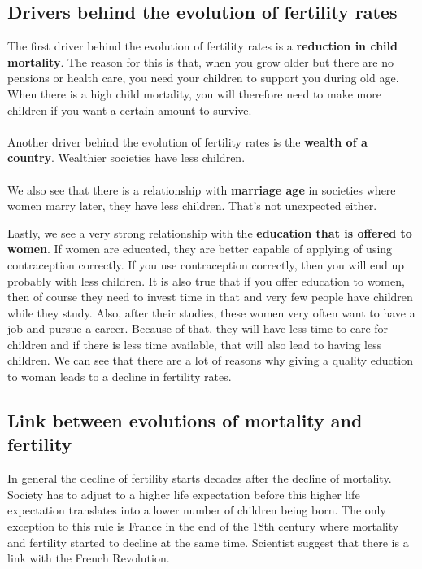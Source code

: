 \documentclass[../summary.tex]{subfiles}
\begin{document}
	\subsection{Drivers behind the evolution of fertility rates}
	The first driver behind the evolution of fertility rates is a \textbf{reduction in child mortality}. The reason for this is that, when you grow older but there are no pensions or health care, you need your children to support you during old age. When there is a high child mortality, you will therefore need to make more children if you want a certain amount to survive.  
	\\
	\\
	Another driver behind the evolution of fertility rates is the \textbf{wealth of a country}. Wealthier societies have less children. 
	\\
	\\
	We also see that there is a relationship with \textbf{marriage age} in societies where women marry later, they have less children. That's not unexpected either. 
	
	Lastly, we see a very strong relationship with the \textbf{education that is offered to women}. If women are educated, they are better capable of applying of using contraception correctly. If you use contraception correctly, then you will end up probably with less children. It is also true that if you offer education to women, then of course they need to invest time in that and very few people have children while they study. Also, after their studies, these women very often want to have a job and pursue a career. Because of that, they will have less time to care for children and if there is less time available, that will also lead to having less children. We can see that there are a lot of reasons why giving a quality eduction to woman leads to a decline in fertility rates.
	
	\subsection{Link between evolutions of mortality and fertility}
	In general the decline of fertility starts decades after the decline of mortality. Society has to adjust to a higher life expectation before this higher life expectation translates into a lower number of children being born. The only exception to this rule is France in the end of the 18th century where mortality and fertility started to decline at the same time. Scientist suggest that there is a link with the French Revolution. 
	
\end{document}

